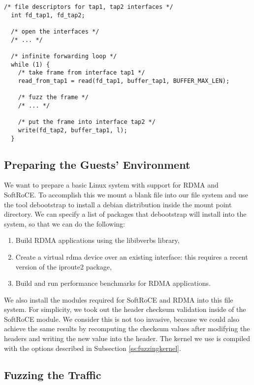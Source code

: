 \begin{lstlisting}[caption={Forwarding traffic in the proxy fuzzer process}, label={lst:fwdtraffic},  style=CStyle, float, floatplacement=H]
  /* file descriptors for tap1, tap2 interfaces */
  int fd_tap1, fd_tap2;

  /* open the interfaces */
  /* ... */

  /* infinite forwarding loop */
  while (1) {
    /* take frame from interface tap1 */
    read_from_tap1 = read(fd_tap1, buffer_tap1, BUFFER_MAX_LEN);

    /* fuzz the frame */
    /* ... */

    /* put the frame into interface tap2 */
    write(fd_tap2, buffer_tap1, l);
  }
\end{lstlisting}

\subsection{Preparing the Guests' Environment}

We want to prepare a basic Linux system with support for RDMA and SoftRoCE.
To accomplish this we mount a blank file into our file system and use the tool
debootstrap to install a debian distribution inside the mount point directory.
We can specify a list of packages that debootstrap will install into the system,
so that we can do the following:

\begin{enumerate}
  \item Build RDMA applications using the libibverbs library,
  \item Create a virtual rdma device over an existing interface: this requires a recent version of the iproute2 package,
  \item Build and run performance benchmarks for RDMA applications.
\end{enumerate}

We also install the modules required for SoftRoCE and RDMA into this file system.
For simplicity, we took out the header checksum validation inside of the SoftRoCE module. We consider
this is not too invasive, because we could also achieve the same results by recomputing the checksum values after modifying
the headers and writing the new value into the header.
The kernel we use is compiled with the options described in Subsection \ref{ss:fuzzingkernel}.

\subsection{Fuzzing the Traffic}

